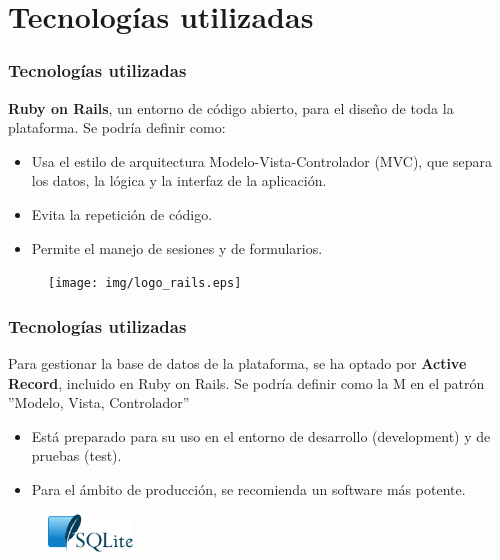 \documentclass{beamer}
\begin{document}

\section{Tecnologías utilizadas}

\begin{frame}
\frametitle{Tecnologías utilizadas}

\textbf{Ruby on Rails}, un entorno de código abierto, para el diseño de toda la plataforma. Se podría definir como:

\begin{itemize}
    \item Usa el estilo de arquitectura Modelo-Vista-Controlador (MVC), que separa los datos, la lógica y la interfaz de la aplicación.
    \item Evita la repetición de código.
    \item Permite el manejo de sesiones y de formularios.
\end{itemize}

\begin{figure}
    \texttt{[image: img/logo\_rails.eps]}
\end{figure}

\end{frame}

\begin{frame}
\frametitle{Tecnologías utilizadas}

Para gestionar la base de datos de la plataforma, se ha optado por \textbf{Active Record}, incluido en Ruby on Rails. Se podría definir como la M en el patrón ''Modelo, Vista, Controlador''

\begin{itemize}
    \item Está preparado para su uso en el entorno de desarrollo (development) y de pruebas (test).
    \item Para el ámbito de producción, se recomienda un software más potente.
\end{itemize}

\begin{figure}
    \includegraphics[width=0.2\textwidth]{img/logo_sqlite.eps}
\end{figure}

\end{frame}
\end{document}
